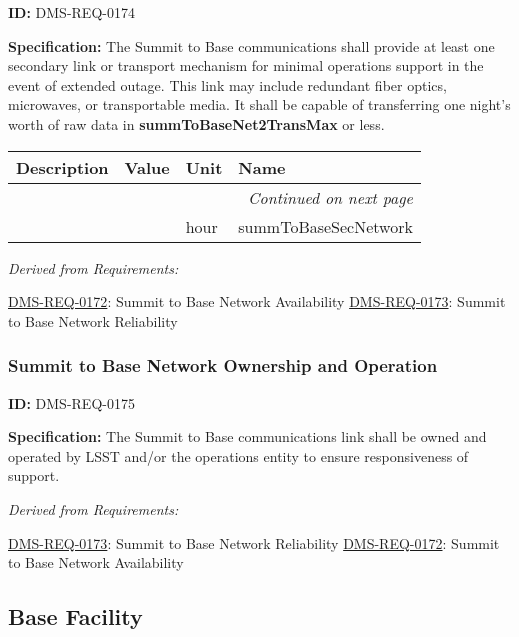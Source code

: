 \documentclass[SE,toc,lsstdraft]{lsstdoc}
\makeatletter
\newcommand{\paramname}[1]{\hspace{0pt}#1}
\newcommand{\unitname}[1]{\hspace{0pt}#1}
\newenvironment{parameters}[0]{%
\setlength\LTleft{0pt}
\setlength\LTright{\fill}
\begin{small}
\begin{longtable}[]{|p{0.5\textwidth}|l|p{0.6in}|p{1.74in}@{}|}

\hline \textbf{Description} & \textbf{Value} & \textbf{Unit} & \textbf{Name} \\ \hline
\endhead

\hline \multicolumn{4}{r}{\emph{Continued on next page}} \\
\endfoot

\hline\hline
\endlastfoot
}{%
\hline
\end{longtable}
\end{small}
}
\makeatother
\begin{document}
\label{DMS-REQ-0174}
\textbf{ID:} DMS-REQ-0174

\textbf{Specification:} The Summit to Base communications shall provide at least one secondary link or transport mechanism for minimal operations support in the event of extended outage.  This link may include redundant fiber optics, microwaves, or transportable media.  It shall be capable of transferring one night's worth of raw data in \textbf{summToBaseNet2TransMax }or less.





\begin{parameters}

&

&
\unitname{%
hour
}
&
\paramname{%
summToBaseSecNetwork
} \\\hline
\end{parameters}




\emph{Derived from Requirements:}

\hyperref[DMS-REQ-0172]{DMS-REQ-0172}:
Summit to Base Network Availability \newline
\hyperref[DMS-REQ-0173]{DMS-REQ-0173}:
Summit to Base Network Reliability \newline


\subsubsection{Summit to Base Network Ownership and Operation}

\label{DMS-REQ-0175}
\textbf{ID:} DMS-REQ-0175

\textbf{Specification:} The Summit to Base communications link shall be owned and operated by LSST and/or the operations entity to ensure responsiveness of support.






\emph{Derived from Requirements:}

\hyperref[DMS-REQ-0173]{DMS-REQ-0173}:
Summit to Base Network Reliability \newline
\hyperref[DMS-REQ-0172]{DMS-REQ-0172}:
Summit to Base Network Availability \newline


\subsection{Base Facility}
\end{document}
